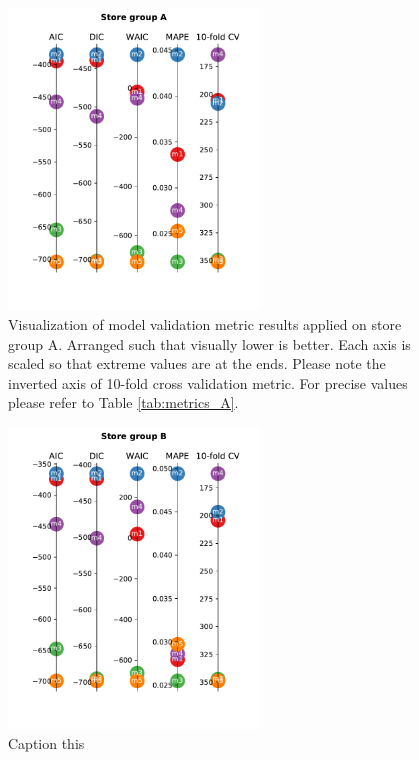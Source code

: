 \documentclass[english, 12pt, a4paper, sci, utf8, a-1b, online]{aaltothesis}
\begin{document}




\begin{figure}[htb]
	\centering
	\includegraphics[height=8cm]{../plots/metrics/metrics_plot_A.pdf}
	\caption{Visualization of model validation metric results applied on store group A. Arranged such that visually lower is better.
	Each axis is scaled so that extreme values are at the ends. Please note the inverted axis of 10-fold cross validation metric. For 
	precise values please refer to Table \ref{tab:metrics_A}.
	}
	\label{fig:metrics_A}
\end{figure}

\begin{figure}[htb]
	\centering
	\includegraphics[height=8cm]{../plots/metrics/metrics_plot_B.pdf}
	\caption{Caption this}
	\label{fig:metrics_B}
\end{figure}
\end{document}
